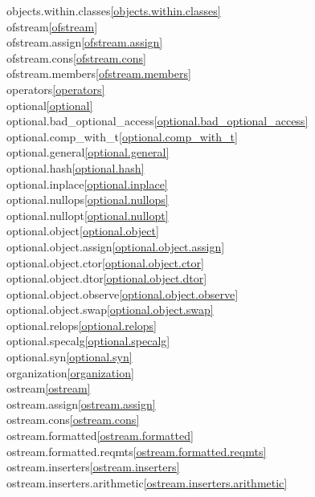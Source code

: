 \begin{multicols}{2}
objects.within.classes\quad\ref{objects.within.classes}\\
ofstream\quad\ref{ofstream}\\
ofstream.assign\quad\ref{ofstream.assign}\\
ofstream.cons\quad\ref{ofstream.cons}\\
ofstream.members\quad\ref{ofstream.members}\\
operators\quad\ref{operators}\\
optional\quad\ref{optional}\\
optional.bad_optional_access\quad\ref{optional.bad_optional_access}\\
optional.comp_with_t\quad\ref{optional.comp_with_t}\\
optional.general\quad\ref{optional.general}\\
optional.hash\quad\ref{optional.hash}\\
optional.inplace\quad\ref{optional.inplace}\\
optional.nullops\quad\ref{optional.nullops}\\
optional.nullopt\quad\ref{optional.nullopt}\\
optional.object\quad\ref{optional.object}\\
optional.object.assign\quad\ref{optional.object.assign}\\
optional.object.ctor\quad\ref{optional.object.ctor}\\
optional.object.dtor\quad\ref{optional.object.dtor}\\
optional.object.observe\quad\ref{optional.object.observe}\\
optional.object.swap\quad\ref{optional.object.swap}\\
optional.relops\quad\ref{optional.relops}\\
optional.specalg\quad\ref{optional.specalg}\\
optional.syn\quad\ref{optional.syn}\\
organization\quad\ref{organization}\\
ostream\quad\ref{ostream}\\
ostream.assign\quad\ref{ostream.assign}\\
ostream.cons\quad\ref{ostream.cons}\\
ostream.formatted\quad\ref{ostream.formatted}\\
ostream.formatted.reqmts\quad\ref{ostream.formatted.reqmts}\\
ostream.inserters\quad\ref{ostream.inserters}\\
ostream.inserters.arithmetic\quad\ref{ostream.inserters.arithmetic}\\

\end{multicols}
